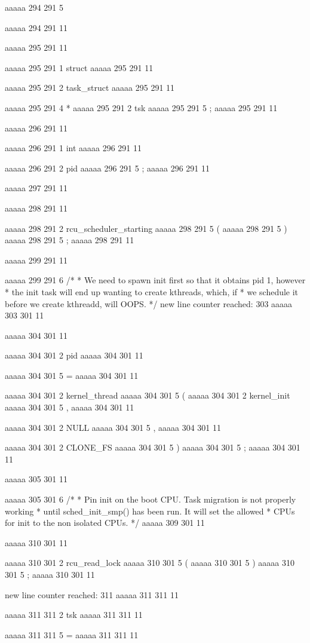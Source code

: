 aaaaa 294 291
5
{
aaaaa 294 291
11


aaaaa 295 291
11
	
aaaaa 295 291
1
struct
aaaaa 295 291
11
 
aaaaa 295 291
2
task_struct
aaaaa 295 291
11
 
aaaaa 295 291
4
*
aaaaa 295 291
2
tsk
aaaaa 295 291
5
;
aaaaa 295 291
11


aaaaa 296 291
11
	
aaaaa 296 291
1
int
aaaaa 296 291
11
 
aaaaa 296 291
2
pid
aaaaa 296 291
5
;
aaaaa 296 291
11


aaaaa 297 291
11


aaaaa 298 291
11
	
aaaaa 298 291
2
rcu_scheduler_starting
aaaaa 298 291
5
(
aaaaa 298 291
5
)
aaaaa 298 291
5
;
aaaaa 298 291
11


aaaaa 299 291
11
	
aaaaa 299 291
6
/*
	 * We need to spawn init first so that it obtains pid 1, however
	 * the init task will end up wanting to create kthreads, which, if
	 * we schedule it before we create kthreadd, will OOPS.
	 */
new line counter reached: 303
aaaaa 303 301
11


aaaaa 304 301
11
	
aaaaa 304 301
2
pid
aaaaa 304 301
11
 
aaaaa 304 301
5
=
aaaaa 304 301
11
 
aaaaa 304 301
2
kernel_thread
aaaaa 304 301
5
(
aaaaa 304 301
2
kernel_init
aaaaa 304 301
5
,
aaaaa 304 301
11
 
aaaaa 304 301
2
NULL
aaaaa 304 301
5
,
aaaaa 304 301
11
 
aaaaa 304 301
2
CLONE_FS
aaaaa 304 301
5
)
aaaaa 304 301
5
;
aaaaa 304 301
11


aaaaa 305 301
11
	
aaaaa 305 301
6
/*
	 * Pin init on the boot CPU. Task migration is not properly working
	 * until sched_init_smp() has been run. It will set the allowed
	 * CPUs for init to the non isolated CPUs.
	 */
aaaaa 309 301
11


aaaaa 310 301
11
	
aaaaa 310 301
2
rcu_read_lock
aaaaa 310 301
5
(
aaaaa 310 301
5
)
aaaaa 310 301
5
;
aaaaa 310 301
11


new line counter reached: 311
aaaaa 311 311
11
	
aaaaa 311 311
2
tsk
aaaaa 311 311
11
 
aaaaa 311 311
5
=
aaaaa 311 311
11
 
}
